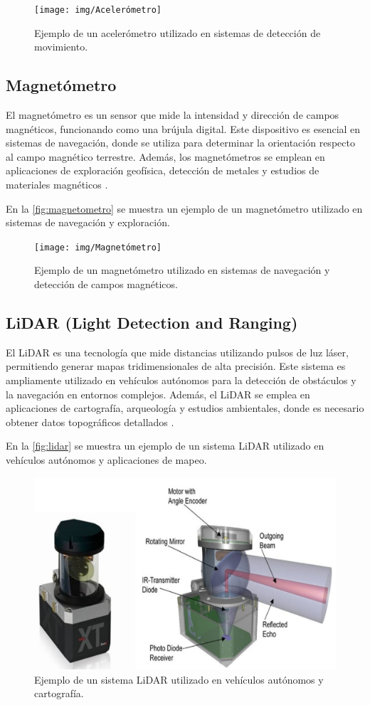 \begin{figure}[h]
	\centering
	\texttt{[image: img/Acelerómetro]}
	\caption{Ejemplo de un acelerómetro utilizado en sistemas de detección de movimiento.}
	\label{fig:acelerometro}
\end{figure}

\subsection{Magnetómetro}
El magnetómetro es un sensor que mide la intensidad y dirección de campos magnéticos, funcionando como una brújula digital. Este dispositivo es esencial en sistemas de navegación, donde se utiliza para determinar la orientación respecto al campo magnético terrestre. Además, los magnetómetros se emplean en aplicaciones de exploración geofísica, detección de metales y estudios de materiales magnéticos \cite{MEMS}.

En la \autoref{fig:magnetometro} se muestra un ejemplo de un magnetómetro utilizado en sistemas de navegación y exploración.

\begin{figure}[h]
	\centering
	\texttt{[image: img/Magnetómetro]}
	\caption{Ejemplo de un magnetómetro utilizado en sistemas de navegación y detección de campos magnéticos.}
	\label{fig:magnetometro}
\end{figure}

\subsection{LiDAR (Light Detection and Ranging)}
El LiDAR es una tecnología que mide distancias utilizando pulsos de luz láser, permitiendo generar mapas tridimensionales de alta precisión. Este sistema es ampliamente utilizado en vehículos autónomos para la detección de obstáculos y la navegación en entornos complejos. Además, el LiDAR se emplea en aplicaciones de cartografía, arqueología y estudios ambientales, donde es necesario obtener datos topográficos detallados \cite{LIDAR}.

En la \autoref{fig:lidar} se muestra un ejemplo de un sistema LiDAR utilizado en vehículos autónomos y aplicaciones de mapeo.

\begin{figure}[h]
	\centering
	\includegraphics[width=0.5\linewidth]{img/LiDAR}
	\caption{Ejemplo de un sistema LiDAR utilizado en vehículos autónomos y cartografía.}
	\label{fig:lidar}
\end{figure}